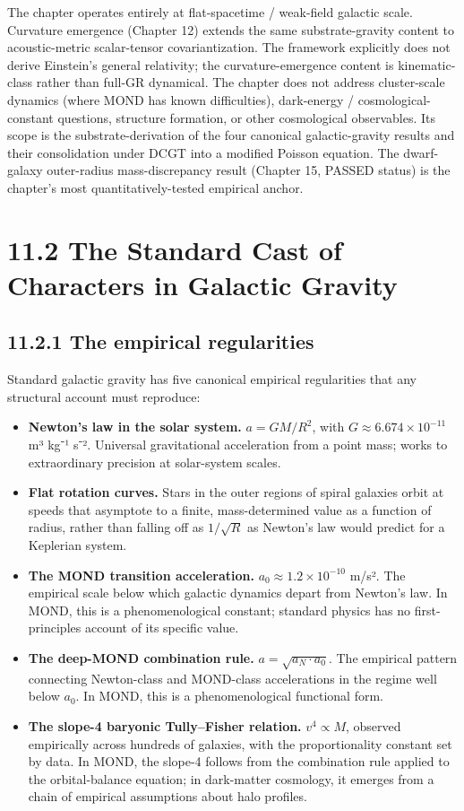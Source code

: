 \documentclass[11pt]{book}
\begin{document}
The chapter operates entirely at flat-spacetime / weak-field galactic scale. Curvature emergence (Chapter 12) extends the same substrate-gravity content to acoustic-metric scalar-tensor covariantization. The framework explicitly does not derive Einstein's general relativity; the curvature-emergence content is kinematic-class rather than full-GR dynamical. The chapter does not address cluster-scale dynamics (where MOND has known difficulties), dark-energy / cosmological-constant questions, structure formation, or other cosmological observables. Its scope is the substrate-derivation of the four canonical galactic-gravity results and their consolidation under DCGT into a modified Poisson equation. The dwarf-galaxy outer-radius mass-discrepancy result (Chapter 15, PASSED status) is the chapter's most quantitatively-tested empirical anchor.

\section{11.2 The Standard Cast of Characters in Galactic Gravity}

\subsection{11.2.1 The empirical regularities}

Standard galactic gravity has five canonical empirical regularities that any structural account must reproduce:

\begin{itemize}
\item \textbf{Newton's law in the solar system.} $a = GM/R^2$, with $G \approx 6.674 \times 10^{-11}$ m³ kg⁻¹ s⁻². Universal gravitational acceleration from a point mass; works to extraordinary precision at solar-system scales.
\item \textbf{Flat rotation curves.} Stars in the outer regions of spiral galaxies orbit at speeds that asymptote to a finite, mass-determined value as a function of radius, rather than falling off as $1/\sqrt{R}$ as Newton's law would predict for a Keplerian system.
\item \textbf{The MOND transition acceleration.} $a_0 \approx 1.2 \times 10^{-10}$ m/s². The empirical scale below which galactic dynamics depart from Newton's law. In MOND, this is a phenomenological constant; standard physics has no first-principles account of its specific value.
\item \textbf{The deep-MOND combination rule.} $a = \sqrt{a_N \cdot a_0}$. The empirical pattern connecting Newton-class and MOND-class accelerations in the regime well below $a_0$. In MOND, this is a phenomenological functional form.
\item \textbf{The slope-4 baryonic Tully–Fisher relation.} $v^4 \propto M$, observed empirically across hundreds of galaxies, with the proportionality constant set by data. In MOND, the slope-4 follows from the combination rule applied to the orbital-balance equation; in dark-matter cosmology, it emerges from a chain of empirical assumptions about halo profiles.
\end{itemize}
\end{document}
